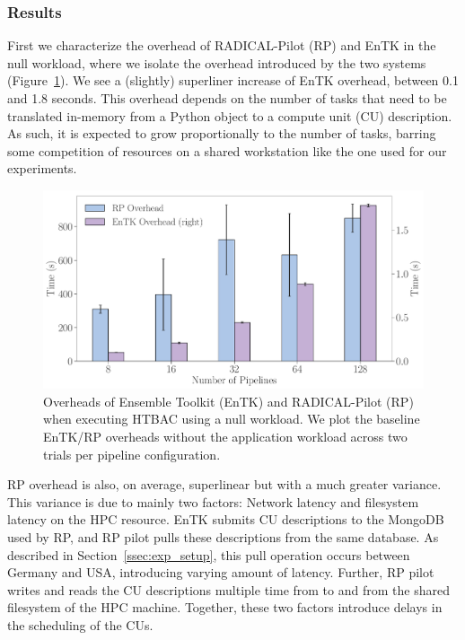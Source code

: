 \subsubsection{Results}\label{ssec:exp_results}

First we characterize the overhead of RADICAL-Pilot (RP) and EnTK in the 
null workload, where we isolate the %
overhead introduced by the two %
systems (Figure~\ref{fig:exp1}). We see a (slightly) superliner
increase of EnTK overhead, between 0.1 and 1.8 seconds. This overhead depends
on the number of tasks that need to be translated in-memory from a Python
object to a compute unit (CU) description. As such, it is expected to grow
proportionally to the number of tasks, barring some competition of resources
on a shared workstation like the one used for our experiments.

\begin{figure}
  \centering
  \includegraphics[width=\columnwidth]{FIGURES/null_workload_overheads.pdf}
  \caption{Overheads of Ensemble Toolkit (EnTK) and RADICAL-Pilot (RP) when
           executing HTBAC using a null workload. We plot the baseline
           EnTK/RP overheads without the application workload across two
           trials per pipeline configuration.}\label{fig:exp1}
\end{figure}


RP overhead is also, on average, superlinear but with a much greater
variance. This variance is due to mainly two factors: Network latency and
filesystem latency on the HPC resource. EnTK submits CU descriptions to the
MongoDB used by RP, and RP pilot pulls these descriptions from the same
database. As described in Section~\ref{ssec:exp_setup}, this pull operation
occurs between Germany and USA, introducing varying amount of latency.
Further, RP pilot writes and reads the CU descriptions multiple time from to
and from the shared filesystem of the HPC machine. Together, these two
factors introduce delays in the scheduling of the CUs.

